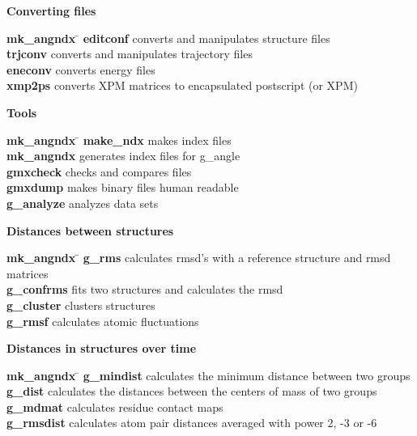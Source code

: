 \begin{description}
\item {\large\bf Converting files}
\begin{tabbing}
{\bf mk\_angndx} \= \kill
{\bf editconf} \> converts and manipulates structure files \\
{\bf trjconv} \> converts and manipulates trajectory files \\
{\bf eneconv} \> converts energy files \\
{\bf xmp2ps} \> converts XPM matrices to encapsulated postscript (or XPM) \\
\end{tabbing}

\item {\large\bf Tools}
\begin{tabbing}
{\bf mk\_angndx} \= \kill
{\bf make\_ndx} \> makes index files \\
{\bf mk\_angndx} \> generates index files for g\_angle \\
{\bf gmxcheck} \> checks and compares files \\
{\bf gmxdump} \> makes binary files human readable \\
{\bf g\_analyze} \> analyzes data sets \\
\end{tabbing}

\item {\large\bf Distances between structures}
\begin{tabbing}
{\bf mk\_angndx} \= \kill
{\bf g\_rms} \> calculates rmsd's with a reference structure and rmsd matrices \\
{\bf g\_confrms} \> fits two structures and calculates the rmsd  \\
{\bf g\_cluster} \> clusters structures \\
{\bf g\_rmsf} \> calculates atomic fluctuations \\
\end{tabbing}

\item {\large\bf Distances in structures over time}
\begin{tabbing}
{\bf mk\_angndx} \= \kill
{\bf g\_mindist} \> calculates the minimum distance between two groups \\
{\bf g\_dist} \> calculates the distances between the centers of mass of two groups \\
{\bf g\_mdmat} \> calculates residue contact maps \\
{\bf g\_rmsdist} \> calculates atom pair distances averaged with power 2, -3 or -6 \\
\end{tabbing}


\end{description}
